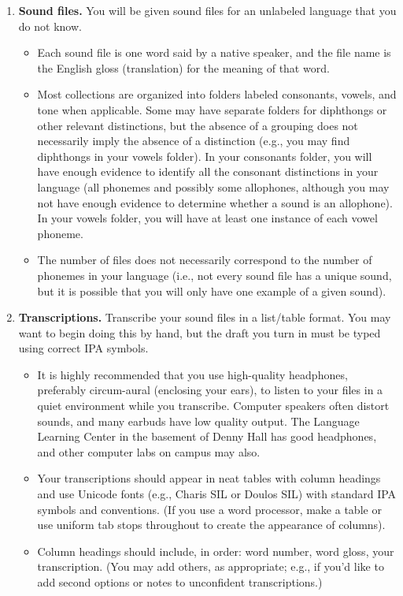 \documentclass[12pt, letterpaper]{article}
\begin{document}
\begin{enumerate}
    \item \textbf{Sound files.} You will be given sound files for an unlabeled language that you do not know.
    \begin{itemize}
        \item Each sound file is one word said by a native speaker, and the file name is the English gloss (translation) for the meaning of that word.
        \item Most collections are organized into folders labeled consonants, vowels, and tone when applicable. Some may have separate folders for diphthongs or other relevant distinctions, but the absence of a grouping does not necessarily imply the absence of a distinction (e.g., you may find diphthongs in your vowels folder). In your consonants folder, you will have enough evidence to identify all the consonant distinctions in your language (all phonemes and possibly some allophones, although you may not have enough evidence to determine whether a sound is an allophone). In your vowels folder, you will have at least one instance of each vowel phoneme.
        \item The number of files does not necessarily correspond to the number of phonemes in your language (i.e., not every sound file has a unique sound, but it is possible that you will only have one example of a given sound).
    \end{itemize}
    \item \textbf{Transcriptions.} Transcribe your sound files in a list/table format. You may want to begin doing this by hand, but the draft you turn in must be typed using correct IPA symbols.
    \begin{itemize}
        \item It is highly recommended that you use high-quality headphones, preferably circum-aural (enclosing your ears), to listen to your files in a quiet environment while you transcribe. Computer speakers often distort sounds, and many earbuds have low quality output. The Language Learning Center in the basement of Denny Hall has good headphones, and other computer labs on campus may also.
        \item Your transcriptions should appear in neat tables with column headings and use Unicode fonts (e.g., Charis SIL or Doulos SIL) with standard IPA symbols and conventions. (If you use a word processor, make a table or use uniform tab stops throughout to create the appearance of columns).
        \item Column headings should include, in order: word number, word gloss, your transcription. (You may add others, as appropriate; e.g., if you’d like to add second options or notes to unconfident transcriptions.)

\end{itemize}
\end{enumerate}
\end{document}
